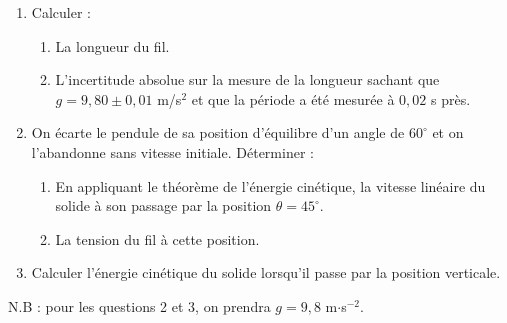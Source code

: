 \documentclass[11pt]{article}
\begin{document}
\begin{enumerate}
  \item Calculer :
  \begin{enumerate}[label=\alph*.]
    \item La longueur du fil.
    \item L'incertitude absolue sur la mesure de la longueur sachant que $g = 9{,}80 \pm 0{,}01$ m/s$^2$ et que la période a été mesurée à $0{,}02$ s près.
  \end{enumerate}
  \item On écarte le pendule de sa position d'équilibre d'un angle de $60^\circ$ et on l'abandonne sans vitesse initiale. Déterminer :
  \begin{enumerate}[label=\alph*.]
    \item En appliquant le théorème de l'énergie cinétique, la vitesse linéaire du solide à son passage par la position $\theta = 45^\circ$.
    \item La tension du fil à cette position.
  \end{enumerate}
  \item Calculer l'énergie cinétique du solide lorsqu'il passe par la position verticale.
\end{enumerate}
\noindent N.B : pour les questions 2 et 3, on prendra $g = 9{,}8$ m$\cdot$s$^{-2}$.
\end{document}
